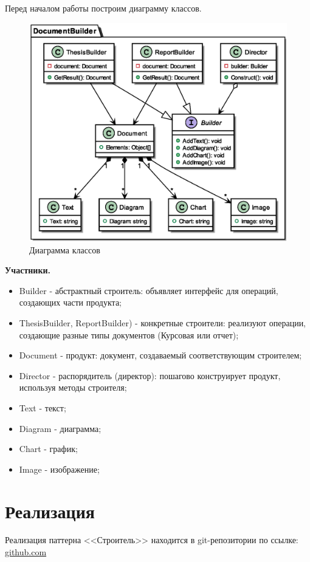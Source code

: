 \documentclass[PI,LAB]{HSEUniversity}
\begin{document}
Перед началом работы построим диаграмму классов.
 \begin{figure}[h]
   \centering
   \includegraphics[scale=0.7]{Task_CD.eps}
   \caption{Диаграмма классов}
 \end{figure}

\textbf{Участники.}
\begin{itemize}
  \item Builder - абстрактный строитель: объявляет интерфейс для операций, создающих части продукта;
  \item ThesisBuilder, ReportBuilder) - конкретные строители: реализуют операции, создающие разные типы документов (Курсовая или отчет);
  \item Document - продукт: документ, создаваемый соответствующим строителем;
  \item Director - распорядитель (директор): пошагово конструирует продукт, используя методы строителя;
  \item Text - текст;
  \item Diagram - диаграмма;
  \item Chart - график;
  \item Image - изображение;
\end{itemize}

\section{Реализация}
Реализация паттерна <<Строитель>> находится в git-репозитории по ссылке: \href{https://github.com/rovany706/design-patterns/tree/Abstract-factory/Builder}{github.com}
\end{document}
